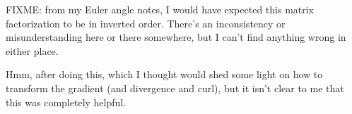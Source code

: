 \documentclass{article}
\begin{document}
FIXME: from my Euler angle notes, I would have expected this matrix factorization to be in inverted order.  There's an inconsistency
or misunderstanding here or there somewhere, but I can't find anything wrong in either place.

Hmm, after doing this, which I thought would shed some light on how to transform the gradient (and divergence and curl), but it isn't clear to me
that this was completely helpful.



\end{document}
